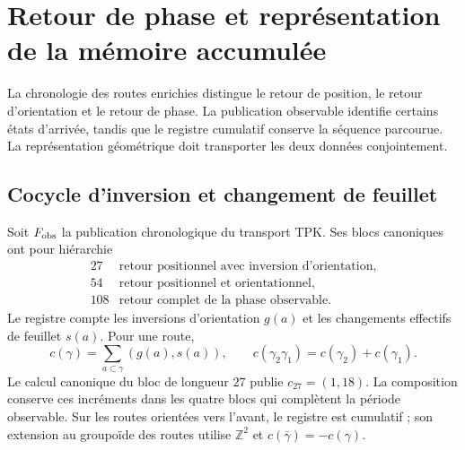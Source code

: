 
\section{Retour de phase et représentation de la mémoire accumulée}
\label{vii:vii:sec:retorno-memoria-gravedad}

La chronologie des routes enrichies distingue le retour de position,
le retour d'orientation et le retour de phase. La publication observable
identifie certains états d'arrivée, tandis que le registre cumulatif
conserve la séquence parcourue. La représentation géométrique doit
transporter les deux données conjointement.

\subsection{Cocycle d'inversion et changement de feuillet}
\label{vii:vii:subsec:cociclo-memoria}

Soit \(F_{\rm obs}\) la publication chronologique du transport TPK.
Ses blocs canoniques ont pour hiérarchie
\[
\begin{array}{c|l}
27&\text{retour positionnel avec inversion d'orientation},\\
54&\text{retour positionnel et orientationnel},\\
108&\text{retour complet de la phase observable}.
\end{array}
\]
Le registre compte les inversions d'orientation \(g(a)\) et les
changements effectifs de feuillet \(s(a)\). Pour une route,
\begin{equation}
 c(\gamma)=\sum_{a\subset\gamma}(g(a),s(a)),\qquad
 c(\gamma_2\gamma_1)=c(\gamma_2)+c(\gamma_1).
 \label{vii:vii:eq:cociclo-ruta}
\end{equation}
Le calcul canonique du bloc de longueur \(27\) publie
\(c_{27}=(1,18)\). La composition conserve ces incréments dans
les quatre blocs qui complètent la période observable.
Sur les routes orientées vers l'avant, le registre est cumulatif ;
son extension au groupoïde des routes utilise \(\mathbb Z^2\) et
\(c(\bar\gamma)=-c(\gamma)\).

